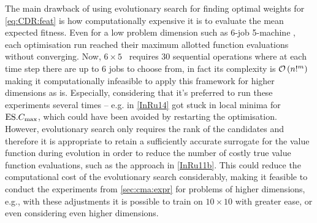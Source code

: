 The main drawback of using evolutionary search for finding optimal weights for 
\cref{eq:CDR:feat} is how computationally expensive it is to evaluate the mean 
expected fitness. Even for a low problem dimension such as 6-job 5-machine 
\JSP, each optimisation run reached their maximum allotted function evaluations 
without converging. 
Now, $6\times5$ \JSP\ requires 30 sequential operations where at each time step 
there are up to $6$ jobs to choose from, in fact its complexity is  
$\mathcal{O}\left(n!^m\right)$ \citep{Giffler60} making it computationally infeasible to apply 
this framework for higher dimensions as is. Especially, considering that it's 
preferred to run these experiments several times -- e.g. in \cref{InRu14} 
 got stuck in local minima for $\text{ES}.{C_{\max}}$, which could have been 
avoided by restarting the optimisation.
However, evolutionary search only requires the rank of the candidates and 
therefore it is appropriate to retain a sufficiently accurate surrogate for the 
value function during evolution in order to reduce the number of costly true 
value function evaluations, such as the approach in \cref{InRu11b}. This could 
reduce the computational cost of the evolutionary search considerably, making 
it feasible to conduct the experiments from \cref{sec:cma:expr} for problems of 
higher dimensions, e.g., with these adjustments it is possible to train on 
$10\times10$ with greater ease, or even considering even higher dimensions.